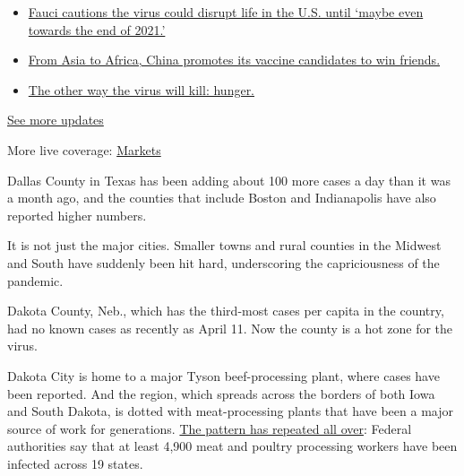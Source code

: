 \begin{itemize}
\tightlist
\item
  \href{https://www.nytimes3xbfgragh.onion/2020/09/11/world/covid-19-coronavirus.html?action=click\&pgtype=Article\&state=default\&region=MAIN_CONTENT_1\&context=storylines_live_updates\#link-dfb8a16}{Fauci
  cautions the virus could disrupt life in the U.S. until `maybe even
  towards the end of 2021.'}
\item
  \href{https://www.nytimes3xbfgragh.onion/2020/09/11/world/covid-19-coronavirus.html?action=click\&pgtype=Article\&state=default\&region=MAIN_CONTENT_1\&context=storylines_live_updates\#link-7104d154}{From
  Asia to Africa, China promotes its vaccine candidates to win friends.}
\item
  \href{https://www.nytimes3xbfgragh.onion/2020/09/11/world/covid-19-coronavirus.html?action=click\&pgtype=Article\&state=default\&region=MAIN_CONTENT_1\&context=storylines_live_updates\#link-393ad215}{The
  other way the virus will kill: hunger.}
\end{itemize}

\href{https://www.nytimes3xbfgragh.onion/2020/09/11/world/covid-19-coronavirus.html?action=click\&pgtype=Article\&state=default\&region=MAIN_CONTENT_1\&context=storylines_live_updates}{See
more updates}

More live coverage:
\href{https://www.nytimes3xbfgragh.onion/live/2020/09/11/business/stock-market-today-coronavirus?action=click\&pgtype=Article\&state=default\&region=MAIN_CONTENT_1\&context=storylines_live_updates}{Markets}

Dallas County in Texas has been adding about 100 more cases a day than
it was a month ago, and the counties that include Boston and
Indianapolis have also reported higher numbers.

It is not just the major cities. Smaller towns and rural counties in the
Midwest and South have suddenly been hit hard, underscoring the
capriciousness of the pandemic.

Dakota County, Neb., which has the third-most cases per capita in the
country, had no known cases as recently as April 11. Now the county is a
hot zone for the virus.

Dakota City is home to a major Tyson beef-processing plant, where cases
have been reported. And the region, which spreads across the borders of
both Iowa and South Dakota, is dotted with meat-processing plants that
have been a major source of work for generations.
\href{https://www.nytimes3xbfgragh.onion/2020/04/22/us/coronavirus-workplaces-midwest.html}{The
pattern has repeated all over}: Federal authorities say that at least
4,900 meat and poultry processing workers have been infected across 19
states.

